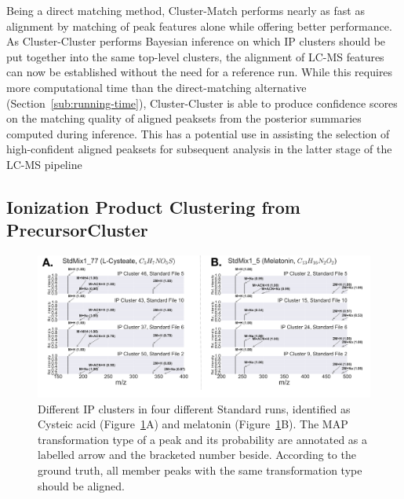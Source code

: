 Being a direct matching method, Cluster-Match performs nearly as fast as alignment by matching of peak features alone while offering better performance. As Cluster-Cluster performs Bayesian inference on which IP clusters should be put together into the same top-level clusters, the alignment of LC-MS features can now be established without the need for a reference run. While this requires more computational time than the direct-matching alternative (Section~\ref{sub:running-time}), Cluster-Cluster is able to produce confidence scores on the matching quality of aligned peaksets from the posterior summaries computed during inference. This has a potential use in assisting the selection of high-confident aligned peaksets for subsequent analysis in the latter stage of the LC-MS pipeline

\subsection{Ionization Product Clustering from PrecursorCluster\label{sub:precursor-cluster-results}}

\begin{figure}[!htbp]
\centering
\includegraphics[width=1.0\linewidth]{05-precursor-cluster/figures/metabolites.pdf}
\caption{\label{fig:06} Different IP clusters in four different Standard runs, identified as Cysteic acid (Figure~\ref{fig:06}A) and melatonin (Figure~\ref{fig:06}B). The MAP transformation type of a peak and its probability are annotated as a labelled arrow and the bracketed number beside. According to the ground truth, all member peaks with the same transformation type should be aligned.}
\end{figure}

